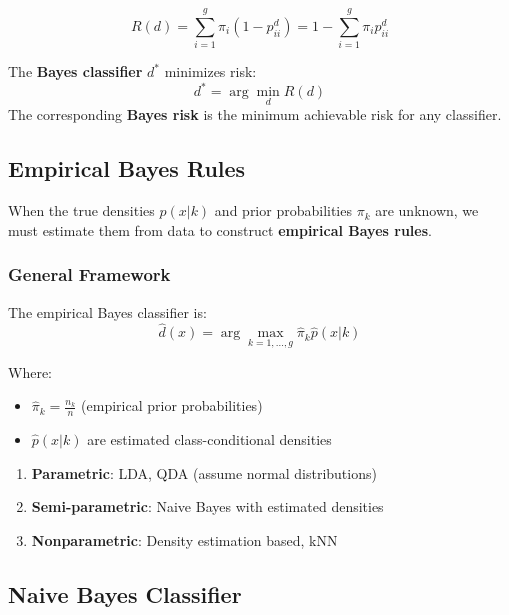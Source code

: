 \documentclass[12pt,a4paper]{article}
\begin{document}
\begin{equation}
R(d) = \sum_{i=1}^g \pi_i (1 - p_{ii}^d) = 1 - \sum_{i=1}^g \pi_i p_{ii}^d
\end{equation}

\begin{tcolorbox}[colback=green!5!white,colframe=green!75!black,title=Bayes Risk]
The \textbf{Bayes classifier} $d^*$ minimizes risk:
$$d^* = \arg\min_d R(d)$$
The corresponding \textbf{Bayes risk} is the minimum achievable risk for any classifier.
\end{tcolorbox}

\subsection{Empirical Bayes Rules}

When the true densities $p(x|k)$ and prior probabilities $\pi_k$ are unknown, we must estimate them from data to construct \textbf{empirical Bayes rules}.

\subsubsection{General Framework}

The empirical Bayes classifier is:
\begin{equation}
\hat{d}(x) = \arg\max_{k=1,\ldots,g} \hat{\pi}_k \hat{p}(x|k)
\end{equation}

Where:
\begin{itemize}
    \item $\hat{\pi}_k = \frac{n_k}{n}$ (empirical prior probabilities)
    \item $\hat{p}(x|k)$ are estimated class-conditional densities
\end{itemize}

\begin{tcolorbox}[colback=blue!5!white,colframe=blue!75!black,title=Types of Empirical Bayes Rules]
\begin{enumerate}
    \item \textbf{Parametric}: LDA, QDA (assume normal distributions)
    \item \textbf{Semi-parametric}: Naive Bayes with estimated densities
    \item \textbf{Nonparametric}: Density estimation based, kNN
\end{enumerate}
\end{tcolorbox}

\subsection{Naive Bayes Classifier}
\end{document}
